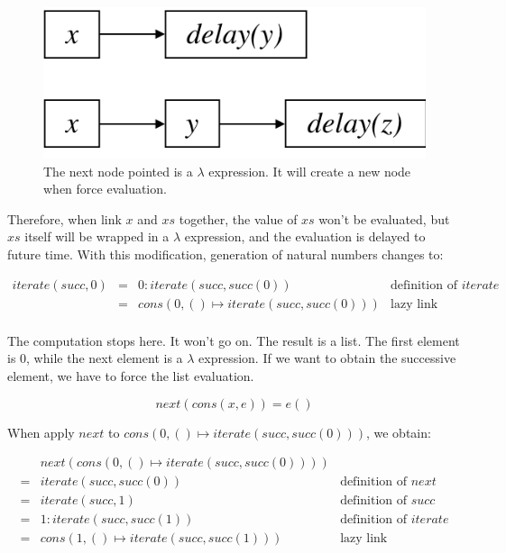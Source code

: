 \documentclass{article}
\begin{document}
\begin{figure}[htbp]
 \centering
 \includegraphics[scale=0.5]{img/stream-cons.png}
 \caption{The next node pointed is a $\lambda$ expression. It will create a new node when force evaluation.}
 \label{fig:stream-cons}
\end{figure}

Therefore, when link $x$ and $xs$ together, the value of $xs$ won't be evaluated, but $xs$ itself will be wrapped in a $\lambda$ expression, and the evaluation is delayed to future time. With this modification, generation of natural numbers changes to:

\[
\begin{array}{rcll}
iterate(succ, 0) & = & 0 : iterate(succ, succ(0)) & \text{definition of } iterate\\
                 & = & cons(0, () \mapsto iterate(succ, succ(0))) & \text{lazy link} \\
\end{array}
\]

The computation stops here. It won't go on. The result is a list. The first element is 0, while the next element is a $\lambda$ expression. If we want to obtain the successive element, we have to force the list evaluation.

\[
next(cons(x, e)) = e()
\]

When apply $next$ to $cons(0, () \mapsto iterate(succ, succ(0)))$, we obtain:

\[
\begin{array}{cll}
  & next(cons(0, () \mapsto iterate(succ, succ(0)))) & \\
= & iterate(succ, succ(0)) & \text{definition of } next\\
= & iterate(succ, 1) & \text{definition of } succ\\
= & 1 : iterate(succ, succ(1)) & \text{definition of } iterate\\
= & cons(1, () \mapsto iterate(succ, succ(1))) & \text{lazy link}
\end{array}
\]
\end{document}
